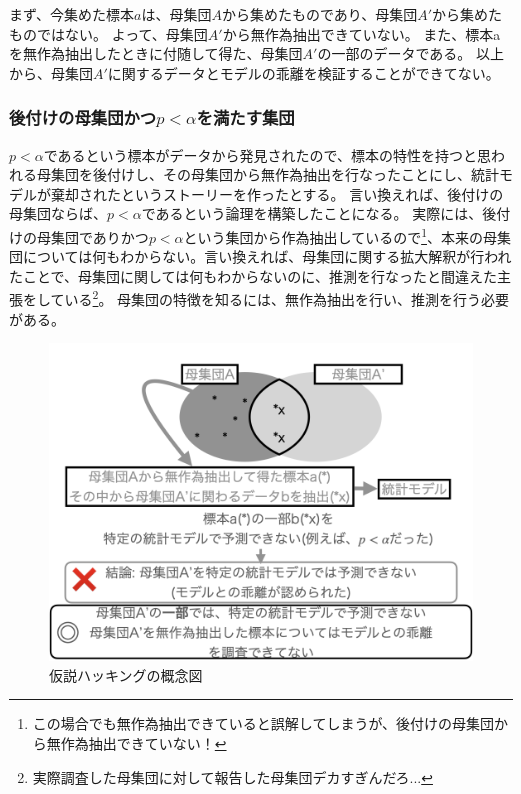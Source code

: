 まず、今集めた標本$a$は、母集団$A$から集めたものであり、母集団$A'$から集めたものではない。
よって、母集団$A'$から無作為抽出できていない。
また、標本aを無作為抽出したときに付随して得た、母集団$A'$の一部のデータである。
以上から、母集団$A'$に関するデータとモデルの乖離を検証することができてない。


\subsubsection{後付けの母集団かつ$p<\alpha$を満たす集団}
$p<\alpha$であるという標本がデータから発見されたので、標本の特性を持つと思われる母集団を後付けし、その母集団から無作為抽出を行なったことにし、統計モデルが棄却されたというストーリーを作ったとする。
言い換えれば、後付けの母集団ならば、$p<\alpha$であるという論理を構築したことになる。
実際には、後付けの母集団でありかつ$p<\alpha$という集団から作為抽出しているので\footnote{この場合でも無作為抽出できていると誤解してしまうが、後付けの母集団から無作為抽出できていない！}、本来の母集団については何もわからない。言い換えれば、母集団に関する拡大解釈が行われたことで、母集団に関しては何もわからないのに、推測を行なったと間違えた主張をしている\footnote{実際調査した母集団に対して報告した母集団デカすぎんだろ...}。
母集団の特徴を知るには、無作為抽出を行い、推測を行う必要がある。


\begin{figure}
    \begin{center}
        \includegraphics[width=15cm]{./image/01_/conceptual_diagram/conceptual_diagram.005.png}
        \caption{仮説ハッキングの概念図}
        \label{fig:conceptual_diagram_HARKing}
    \end{center}
\end{figure}
    

